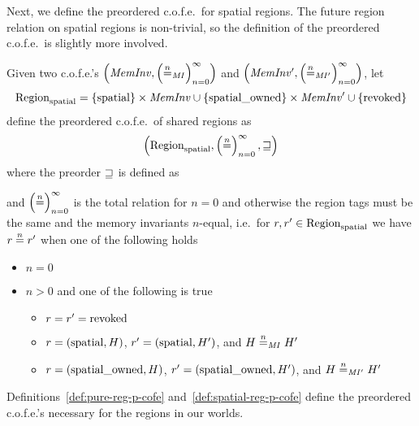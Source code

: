 \begin{jversion}
Next, we define the preordered c.o.f.e.\ for spatial regions.
The future region relation on spatial regions is non-trivial, so the definition of the preordered c.o.f.e.\ is slightly more involved.
\begin{definition}
  \label{def:spatial-reg-p-cofe}
  Given two c.o.f.e.'s $\left(\var{MemInv},\left(\nequal[n]_\var{MI}\right)_{n=0}^{\infty}\right)$ and $\left(\var{MemInv'},\left(\nequal[n]_\var{MI'}\right)_{n=0}^{\infty}\right)$, let
  \[
    \Regions = \{\spatial\}\times \var{MemInv} \cup \{\spatialo\} \times \var{MemInv'} \cup \{\revoked\}
  \]
  define the preordered c.o.f.e.\ of shared regions as
  \[
  \left(\Regions,\left(\nequal[n]\right)_{n=0}^{\infty},\future\right)
  \]
  where the preorder $\future$ is defined as
  and $\left(\nequal[n]\right)_{n=0}^{\infty}$ is the total relation for $n=0$ and otherwise the region tags must be the same and the memory invariants $n$-equal, i.e.\ 
  for $r ,r' \in \Regions$ we have $r \nequal r'$ when one of the following holds
  \begin{itemize}
  \item $n=0$
  \item $n > 0$ and one of the following is true
    \begin{itemize}
    \item $r = r' = \revoked$
    \item $r = (\spatial,H)$, $r' = (\spatial,H')$, and $H \nequal_\var{MI} H'$
    \item $r = (\spatialo,H)$, $r' = (\spatialo,H')$, and $H \nequal_\var{MI'} H'$
    \end{itemize}
  \end{itemize}
\end{definition}
Definitions~\ref{def:pure-reg-p-cofe} and~\ref{def:spatial-reg-p-cofe} define the preordered c.o.f.e.'s necessary for the regions in our worlds.


\end{jversion}
